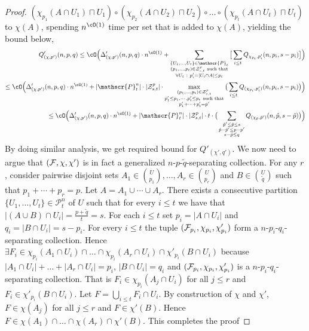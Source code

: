 \begin{proof}
$({\chi}_{p_1}(A \cap U_1) \sqcap U_1) \circ ({\chi}_{p_2}(A \cap U_2) \sqcap U_2) \circ \ldots \circ ({\chi}_{p_t}(A \cap U_t) \sqcap U_t)$ 
to $\chi(A)$, spending $n^{\cO(1)}$ time per set that is added to $\chi(A)$, yielding the bound below, 
\begin{align*}
Q'_{(\chi,p')}(n,p,q) \leq \cO\Big(\Delta'_{(\chi,p')}(n,p,q) \cdot n^{\cO(1)} + \sum_{\substack{\{U_1,\ldots,U_{t}\} \in \mathscr{P}_{t}\\(p_1,\ldots,p_t) \in {\cal Z}_{s,t}^{p}~\mbox{\scriptsize such that}\\ \forall U_i~:~p_i' = |U_i \cap A| \leq p_i}} \big[\sum_{i \leq t} Q_{\chi_{p_i},p_i'}(n,p_i,s-p_i)\big]\Big) \\
\leq \cO\Big(\Delta'_{(\chi,p')}(n,p,q) \cdot n^{\cO(1)} + |\mathscr{P}_{t}^n|\cdot |{\cal Z}_{s,t}^p| \cdot 
\max_{\substack{(p_1,\ldots,p_t) \in {\cal Z}_{s,t}^p\\ p_1'\leq p_1,\cdots,p_t'\leq p_t~\mbox{\scriptsize such that}\\p_1'+\cdots +p_t'=p'}} \big( \sum_{i \leq t} Q_{(\chi_{p_i},p_i')}(n,p_i,s-p_i)\big)  \Big) \\
\leq \cO\Big(\Delta'_{(\chi,p')}(n,p,q) \cdot n^{\cO(1)} + |\mathscr{P}_{t}^n|\cdot |{\cal Z}_{s,t}^p| \cdot t\cdot 
\big( \sum_{\substack{ \hat{p}'\leq \hat{p}\leq s \\ \hat{p}-\hat{p}'\leq p-p' \\ s-\hat{p}\leq q }} Q_{(\chi_{\hat{p}},\hat{p}')}(n,\hat{p},s-\hat{p})\big)  \Big) \\
\end{align*}
By doing similar analysis, we get required bound for $Q'_{(\chi',q')}$.  
We now need to argue that $({\cal F}, \chi,\chi')$ is in fact a generalized  $n$-$p$-$\tilde{q}$-separating collection. For any 
$r$, consider pairwise disjoint sets $A_1\in {U \choose p_1},\ldots,A_r\in {U \choose p_r}$ and 
$B \in {U \choose \tilde{q}}$ such that $p_1+\cdots+p_r=p$. Let $A=A_1\cup\cdots\cup A_r$. There exists a 
consecutive partition $\{U_1, \ldots, U_t\} \in \mathscr{P}_t^n$ of $U$ such that for every $i \leq t$ we have that 
$|(A \cup B) \cap U_i| = \frac{p+\tilde{q}}{t} = s$. For each $i \leq t$ set $p_i =  |A \cap U_i|$ and 
$q_i = |B \cap U_i| = s - p_i$. For every $i \leq t$ the tuple $({\cal F}_{p_i}, {\chi}_{p_i},\chi'_{p_i})$ form 
a $n$-$p_i$-$q_i$-separating collection. Hence 
$\exists F_i \in \chi_{p_i}(A_1\cap U_i)\cap\ldots\cap\chi_{p_i}(A_r\cap U_i) \cap \chi'_{p_i}(B\cap U_i)$ 
because $|A_1\cap U_i|+\ldots+|A_r\cap U_i|=p_i$, $|B\cap U_i|=q_i$ and 
$({\cal F}_{p_i}, {\chi}_{p_i},\chi'_{p_i})$ is a $n$-$p_i$-$q_i$-separating collection. That is 
$F_i \in \chi_{p_i}(A_j\cap U_i)$ for all $j\leq r$ and $F_i \in \chi'_{p_i}(B\cap U_i)$. Let 
$F=\bigcup_{i\leq t}F_i\cap U_i$. By construction of $\chi$ and $\chi'$, $F \in \chi(A_j)$ for all $j\leq r$  and 
$F \in \chi'(B)$. Hence $F \in \chi(A_1)\cap\ldots\cap \chi(A_r)\cap\chi'(B)$. This completes the proof
\end{proof}

